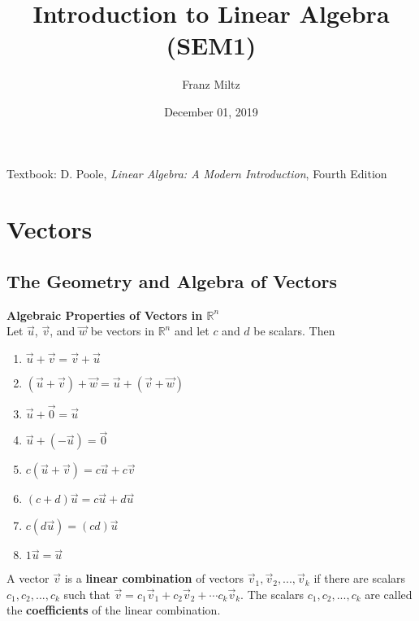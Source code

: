 \documentclass{article}
\begin{document}
\title{Introduction to Linear Algebra (SEM1)}
\author{Franz Miltz}
\date{December 01, 2019}
\maketitle
\noindent Textbook: D. Poole, \emph{Linear Algebra: A Modern Introduction}, Fourth Edition
\tableofcontents
\pagebreak
\section{Vectors}
\subsection{The Geometry and Algebra of Vectors}
\begin{theorem}
	\textbf{Algebraic Properties of Vectors in $\mathbb{R}^n$}\\
	Let $\vec u$, $\vec v$, and $\vec w$ be vectors in $\mathbb{R}^n$ and let $c$ and $d$ be scalars. Then
	\begin{enumerate}
		\item $\vec u + \vec v = \vec v + \vec u$
		\item $(\vec u + \vec v) + \vec w = \vec u + (\vec v + \vec w)$
		\item $\vec u + \vec 0 = \vec u$
		\item $\vec u + (- \vec u) = \vec 0$
		\item $c(\vec u + \vec v) = c\vec u + c\vec v$
		\item $(c+d)\vec u = c\vec u + d\vec u$
		\item $c(d\vec u) = (cd)\vec u$
		\item $1\vec u = \vec u$
	\end{enumerate}
\end{theorem}
\begin{definition}
	A vector $\vec v$ is a \textbf{linear combination} of vectors $\vec v_1, \vec v_2, ...,\vec v_k$ if there are scalars $c_1, c_2, ..., c_k$ such that $\vec v = c_1 \vec v_1 + c_2 \vec v_2 + \cdots c_k\vec v_k$. The scalars $c_1, c_2, ..., c_k$ are called the \textbf{coefficients} of the linear combination.
\end{definition}
\end{document}
